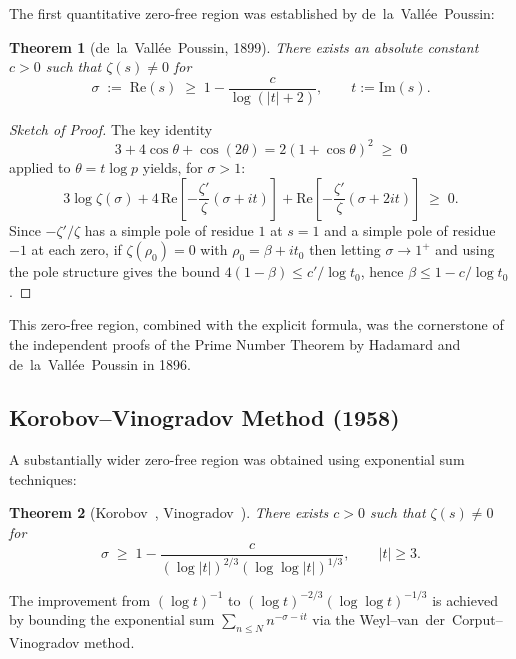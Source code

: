 \documentclass[12pt,a4paper]{article}
\newtheorem{theorem}{Theorem}[section]
\theoremstyle{remark}
\begin{document}
The first quantitative zero-free region was established by de~la~Vallée~Poussin:

\begin{theorem}[de~la~Vallée~Poussin, 1899]\label{thm:dvp}
  There exists an absolute constant $c > 0$ such that $\zeta(s) \neq 0$ for
  \[
    \sigma \;:=\; \mathrm{Re}(s) \;\geq\; 1 - \frac{c}{\log(|t|+2)},
    \qquad t := \mathrm{Im}(s).
  \]
\end{theorem}

\begin{proof}[Sketch of Proof]
  The key identity
  \[
    3 + 4\cos\theta + \cos(2\theta) = 2(1+\cos\theta)^2 \;\geq\; 0
  \]
  applied to $\theta = t\log p$ yields, for $\sigma > 1$:
  \[
    3\log\zeta(\sigma) + 4\,\mathrm{Re}\!\left[-\frac{\zeta'}{\zeta}(\sigma+it)\right]
    + \mathrm{Re}\!\left[-\frac{\zeta'}{\zeta}(\sigma+2it)\right] \;\geq\; 0.
  \]
  Since $-\zeta'/\zeta$ has a simple pole of residue $1$ at $s=1$ and a simple pole of
  residue $-1$ at each zero, if $\zeta(\rho_0)=0$ with $\rho_0=\beta+it_0$ then letting
  $\sigma\to 1^+$ and using the pole structure gives the bound
  $4(1-\beta) \leq c'/\log t_0$, hence $\beta \leq 1 - c/\log t_0$.
\end{proof}

This zero-free region, combined with the explicit formula, was the cornerstone of the
independent proofs of the Prime Number Theorem by Hadamard and de~la~Vallée~Poussin in 1896.

\subsection{Korobov--Vinogradov Method (1958)}

A substantially wider zero-free region was obtained using exponential sum techniques:

\begin{theorem}[Korobov~\cite{Korobov1958}, Vinogradov~\cite{Vinogradov1958}]
  There exists $c > 0$ such that $\zeta(s) \neq 0$ for
  \begin{equation}\label{eq:kv}
    \sigma \;\geq\; 1 - \frac{c}{(\log|t|)^{2/3}(\log\log|t|)^{1/3}},
    \qquad |t| \geq 3.
  \end{equation}
\end{theorem}

The improvement from $(\log t)^{-1}$ to $(\log t)^{-2/3}(\log\log t)^{-1/3}$ is
achieved by bounding the exponential sum $\sum_{n\leq N} n^{-\sigma-it}$ via the
Weyl--van~der~Corput--Vinogradov method.
\end{document}
